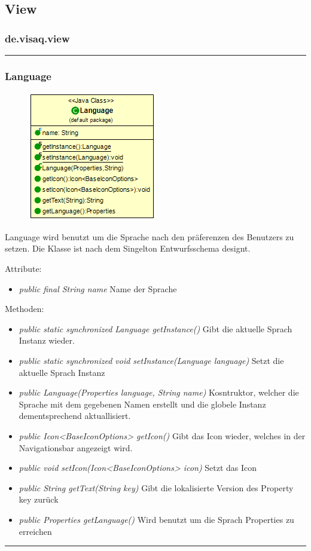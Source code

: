 \subsection{View}



\subsubsection{de.visaq.view}
\rule{\textwidth}{0.4pt}
\subsubsection {Language}
\begin{minipage}{0.3\textwidth}
    \begin{figure}[H]
        {\centering\includegraphics[scale = 0.5
        ]{media/view/view/Language_Class.png}}
    \end{figure}
    \end{minipage} \hfill
    \begin{minipage}{0.6\textwidth}
    Language wird benutzt um die Sprache nach den präferenzen des Benutzers zu setzen. Die Klasse ist nach dem Singelton Entwurfsschema designt.
    \end{minipage}
    Attribute: \begin{itemize} [noitemsep]
    \item \emph{public final String name} Name der Sprache
    \end{itemize}
    Methoden: \begin{itemize} [noitemsep]
    \item \emph{public static synchronized Language getInstance()} Gibt die aktuelle Sprach Instanz wieder.
    \item \emph{public static synchronized void setInstance(Language language)} Setzt die aktuelle Sprach Instanz
    \item \emph{public Language(Properties language, String name)} Kosntruktor, welcher die Sprache mit dem gegebenen Namen erstellt und die globele Instanz dementsprechend aktuallisiert.
    \item \emph{public Icon<BaseIconOptions> getIcon()} Gibt das Icon wieder, welches in der Navigationsbar angezeigt wird.
    \item \emph{public void setIcon(Icon<BaseIconOptions> icon)} Setzt das Icon
    \item \emph{public String getText(String key)} Gibt die lokalisierte Version des Property key zurück
    \item \emph{public Properties getLanguage()} Wird benutzt um die Sprach Properties zu erreichen
\end{itemize}
\rule{\textwidth}{0.4pt}

